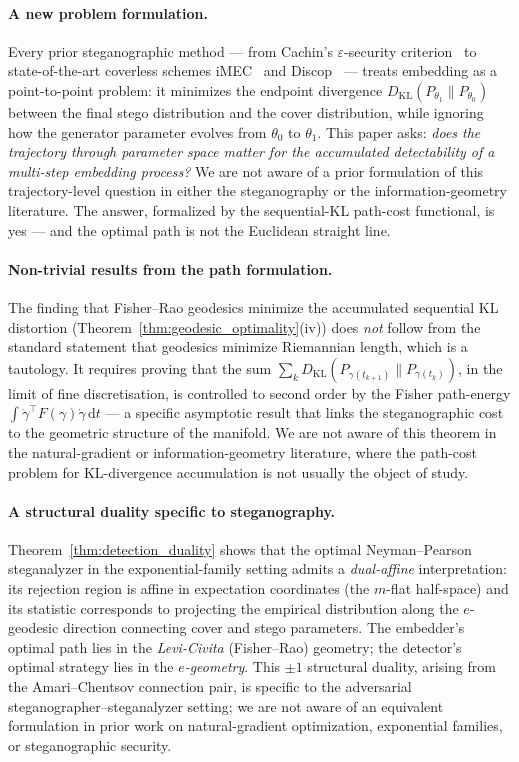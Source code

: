 \documentclass[a4paper,fleqn]{cas-dc}
\begin{document}
\paragraph{A new problem formulation.}
Every prior steganographic method --- from Cachin's $\varepsilon$-security
criterion~\cite{cachin1998information} to state-of-the-art coverless schemes
iMEC~\cite{imec2022} and Discop~\cite{discop2023} --- treats embedding as a
point-to-point problem: it minimizes the endpoint divergence
$D_{\mathrm{KL}}(P_{\theta_1}\|P_{\theta_0})$ between the final stego
distribution and the cover distribution, while ignoring how the generator
parameter evolves from $\theta_0$ to $\theta_1$.
This paper asks: \emph{does the trajectory through parameter space matter for
the accumulated detectability of a multi-step embedding process?}
We are not aware of a prior formulation of this trajectory-level question in
either the steganography or the information-geometry literature.
The answer, formalized by the sequential-KL path-cost functional, is yes --- and
the optimal path is not the Euclidean straight line.

\paragraph{Non-trivial results from the path formulation.}
The finding that Fisher--Rao geodesics minimize the accumulated sequential KL
distortion (Theorem~\ref{thm:geodesic_optimality}(iv)) does \emph{not} follow
from the standard statement that geodesics minimize Riemannian length, which is
a tautology.
It requires proving that the sum
$\sum_k D_{\mathrm{KL}}(P_{\gamma(t_{k+1})}\|P_{\gamma(t_k)})$,
in the limit of fine discretisation, is controlled to second order by the Fisher
path-energy $\int \dot\gamma^\top F(\gamma)\dot\gamma\,\mathrm{d}t$ --- a
specific asymptotic result that links the steganographic cost to the geometric
structure of the manifold.
We are not aware of this theorem in the natural-gradient or
information-geometry literature, where the path-cost problem for KL-divergence
accumulation is not usually the object of study.

\paragraph{A structural duality specific to steganography.}
Theorem~\ref{thm:detection_duality} shows that the optimal Neyman--Pearson
steganalyzer in the exponential-family setting admits a \emph{dual-affine}
interpretation: its rejection region is affine in expectation coordinates (the
$m$-flat half-space) and its statistic corresponds to projecting the empirical
distribution along the $e$-geodesic direction connecting cover and stego
parameters.
The embedder's optimal path lies in the \emph{Levi-Civita} (Fisher--Rao)
geometry; the detector's optimal strategy lies in the \emph{$e$-geometry}.
This $\pm 1$ structural duality, arising from the Amari--Chentsov connection
pair, is specific to the adversarial steganographer--steganalyzer setting; we
are not aware of an equivalent formulation in prior work on natural-gradient
optimization, exponential families, or steganographic security.
\end{document}
